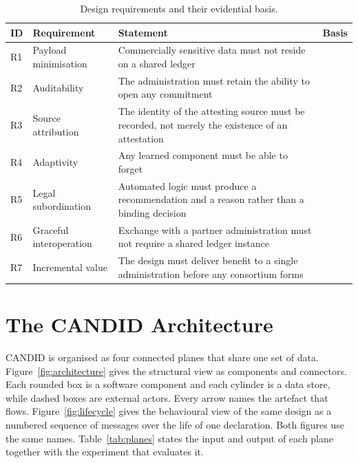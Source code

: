 \documentclass[information,article,submit,moreauthors]{Definitions/mdpi}
\begin{document}
\begin{table}[H]
\caption{Design requirements and their evidential basis.\label{tab:requirements}}
\small
\begin{tabularx}{\textwidth}{>{\raggedright\arraybackslash}p{1.1cm}>{\raggedright\arraybackslash}p{3.3cm}>{\raggedright\arraybackslash}X>{\raggedright\arraybackslash}p{2.6cm}}
\toprule
\textbf{ID} & \textbf{Requirement} & \textbf{Statement} & \textbf{Basis}\\
\midrule
R1 & Payload minimisation & Commercially sensitive data must not reside on a shared ledger & \cite{vanengelenburg2019b2g}\\
R2 & Auditability & The administration must retain the ability to open any commitment & \cite{androulaki2020auditable}\\
R3 & Source attribution & The identity of the attesting source must be recorded, not merely the existence of an attestation & \cite{caldarelli2020oracle}\\
R4 & Adaptivity & Any learned component must be able to forget & \cite{ababneh2026trustdecay}\\
R5 & Legal subordination & Automated logic must produce a recommendation and a reason rather than a binding decision & \cite{governatori2018legal,mik2017limitations}\\
R6 & Graceful interoperation & Exchange with a partner administration must not require a shared ledger instance & \cite{belchior2021interop}\\
R7 & Incremental value & The design must deliver benefit to a single administration before any consortium forms & \cite{sternberg2021struggle,maersk2022tradelens}\\
\bottomrule
\end{tabularx}
\end{table}

\section{The CANDID Architecture}\label{sec:architecture}

CANDID is organised as four connected planes that share one set of data. Figure~\ref{fig:architecture} gives the structural view as components and connectors. Each rounded box is a software component and each cylinder is a data store, while dashed boxes are external actors. Every arrow names the artefact that flows. Figure~\ref{fig:lifecycle} gives the behavioural view of the same design as a numbered sequence of messages over the life of one declaration. Both figures use the same names. Table~\ref{tab:planes} states the input and output of each plane together with the experiment that evaluates it.
\end{document}
